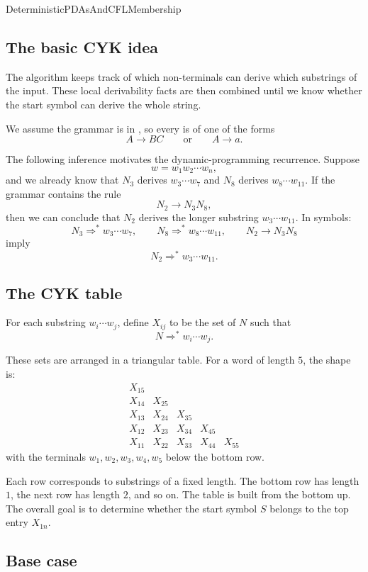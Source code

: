 \documentclass[hidelinks]{article}
\begin{document}
\begin{smodule}[title={Deterministic PDAs and CFL Membership}]{DeterministicPDAsAndCFLMembership}
\subsection{The basic CYK idea}

The algorithm keeps track of which non-terminals can derive which substrings of the input.
These local derivability facts are then combined until we know whether the start symbol can derive the whole string.

We assume the grammar is in , so every  is of one of the forms
\[
A \to BC
\qquad \text{or} \qquad
A \to a.
\]

The following inference motivates the dynamic-programming recurrence.
Suppose
\[
w = w_1w_2\cdots w_n,
\]
and we already know that $N_3$ derives $w_3\cdots w_7$ and $N_8$ derives $w_8\cdots w_{11}$.
If the grammar contains the rule
\[
N_2 \to N_3N_8,
\]
then we can conclude that $N_2$ derives the longer substring $w_3\cdots w_{11}$.
In symbols:
\[
N_3 \Rightarrow^* w_3\cdots w_7,
\qquad
N_8 \Rightarrow^* w_8\cdots w_{11},
\qquad
N_2 \to N_3N_8
\]
imply
\[
N_2 \Rightarrow^* w_3\cdots w_{11}.
\]

\subsection{The CYK table}

For each substring $w_i\cdots w_j$, define $X_{ij}$ to be the set of  $N$ such that
\[
N \Rightarrow^* w_i\cdots w_j.
\]

These sets are arranged in a triangular table.
For a word of length $5$, the shape is:
\[
\begin{array}{ccccc}
X_{15} \\
X_{14} & X_{25} \\
X_{13} & X_{24} & X_{35} \\
X_{12} & X_{23} & X_{34} & X_{45} \\
X_{11} & X_{22} & X_{33} & X_{44} & X_{55}
\end{array}
\]
with the terminals $w_1,w_2,w_3,w_4,w_5$ below the bottom row.

Each row corresponds to substrings of a fixed length.
The bottom row has length $1$, the next row has length $2$, and so on.
The table is built from the bottom up.
The overall goal is to determine whether the start symbol $S$ belongs to the top entry $X_{1n}$.

\subsection{Base case}


\end{smodule}
\end{document}
